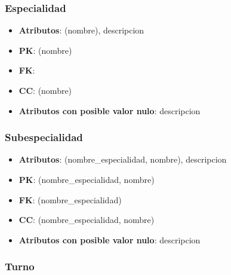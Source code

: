 \documentclass[a4paper,11pt]{article}
\begin{document}
\subsubsection{\textbf{Especialidad}}

\begin{itemize}

\item 
\textbf{Atributos}: (nombre), descripcion

\item 
\textbf{PK}: (nombre)

\item
\textbf{FK}:

\item 
\textbf{CC}: (nombre)

\item 
\textbf{Atributos con posible valor nulo}: descripcion

\end{itemize}
\subsubsection{\textbf{Subespecialidad}}

\begin{itemize}

\item 
\textbf{Atributos}: (nombre\_especialidad, nombre), descripcion

\item 
\textbf{PK}: (nombre\_especialidad, nombre)

\item
\textbf{FK}: (nombre\_especialidad)

\item 
\textbf{CC}: (nombre\_especialidad, nombre)

\item 
\textbf{Atributos con posible valor nulo}: descripcion

\end{itemize}
\subsubsection{\textbf{Turno}}
\end{document}
